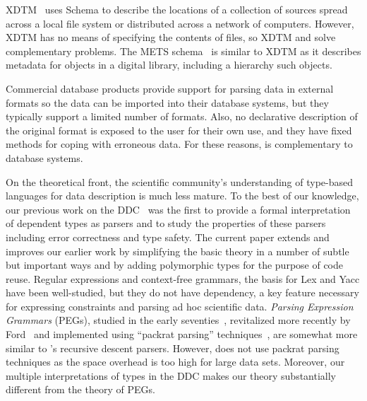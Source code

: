 
XDTM~\cite{xdtm,zhao+:sigmod05} uses \xml{} Schema to describe the
locations of a collection of sources spread across a local file system
or distributed across a network of computers.  However, XDTM has no
means of specifying the contents of files, so XDTM and \padsml{} solve
complementary problems.  The METS schema~\cite{mets} is similar to XDTM as
it describes metadata for objects in a digital library, including a
hierarchy such objects.

Commercial database products provide support for
parsing data in external formats so the data can be imported into
their database systems, but they typically support a limited number of
formats.  Also, no declarative description of the
original format is exposed to the user for their own use, and they
have fixed methods for coping with erroneous data.  For these reasons,
\padsml{} is complementary to database systems.  

On the theoretical front, the scientific community's understanding of
type-based languages for data description is much less mature.  To the
best of our knowledge, our previous work on the DDC~\cite{fisher+:next700ddl} 
was the first to provide a
formal interpretation of dependent types as parsers and to study the
properties of these parsers including error correctness and type
safety.  The current paper extends and improves our earlier work 
by simplifying the basic theory in a number of subtle but important ways
and by adding polymorphic types for the purpose of code reuse.
Regular expressions and context-free grammars, the basis for
Lex and Yacc have been well-studied, but they do not have dependency,
a key feature necessary for expressing constraints and parsing ad hoc
scientific data.  {\em Parsing Expression Grammars} (PEGs), studied in
the early seventies~\cite{birman+:parsing}, revitalized more recently
by Ford~\cite{ford:pegs} and implemented using ``packrat parsing''
techniques~\cite{ford:packrat,grimm:packrat}, are somewhat more
similar to \padsml{}'s recursive descent parsers. However, \padsml{} does not use
packrat parsing techniques as the space overhead is too high for large
data sets.  Moreover, our multiple interpretations of types
in the DDC makes our theory substantially different from the theory of
PEGs.

